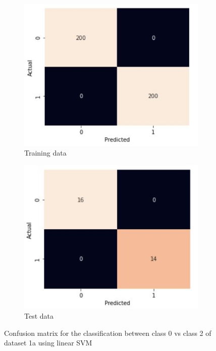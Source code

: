 \documentclass[11pt]{article}
\begin{document}
\begin{figure}[h]
\centering
	\begin{subfigure}[b]{0.45\textwidth}
	\centering
	\includegraphics[scale=0.4]{dataset1a_linear_svm_02_cm_train.jpg}
	\caption{Training data}
	\label{fig:fig1.3.2.1}
	\end{subfigure}
	\begin{subfigure}[b]{0.45\textwidth}
	\centering
	\includegraphics[scale=0.4]{dataset1a_linear_svm_02_cm_test.jpg}
	\caption{Test data}
	\label{fig:fig1.3.2.2}
	\end{subfigure}
\caption{Confusion matrix for the classification between class 0 vs class 2 of dataset 1a using linear SVM}
\label{fig:fig1.3.2}
\end{figure}

\newpage
\end{document}
